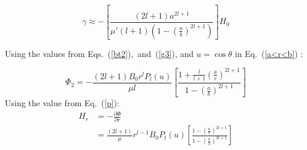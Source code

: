 \begin{equation}\label{g3}
\gamma\approx-\left[\frac{(2l+1)a^{2l+1}}{\mu'(l+1)\left(1-\left(\frac{a}{b}\right)^{2l+1}\right)}\right] H_0
\end{equation}


Using the values from Eqs.~(\ref{bt2}),~and~(\ref{g3}), and $u=\cos\theta$ in Eq.~(\ref{a<r<b}) :



\begin{equation}\label{p}
\Phi_2=-\frac{(2l+1)B_0r^lP_l(u)}{\mu l}\left[\frac{1+\frac{l}{l+1}\left(\frac{a}{r}\right)^{2l+1}}{1-\left(\frac{a}{b}\right)^{2l+1}}\right]
\end{equation}
Using the value from Eq.~(\ref{p}):
\begin{equation}\label{Hr}
\begin{split}
    H_r &=-\frac{\partial \Phi}{\partial r}\\
      &=\frac{(2l+1)}{\mu}r^{l-1}B_0P_l(u)\left[\frac{1-\left(\frac{a}{r}\right)^{2l+1}}{1-\left(\frac{a}{b}\right)^{2l+1}}\right]
\end{split}
\end{equation}

